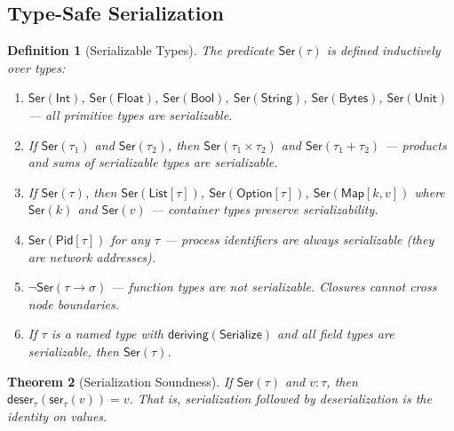 \documentclass[11pt,a4paper]{article}
\newtheorem{theorem}{Theorem}[section]
\newtheorem{definition}[theorem]{Definition}
\newcommand{\pid}{\textsf{Pid}}
\newcommand{\Ser}{\mathsf{Ser}}
\begin{document}
\subsection{Type-Safe Serialization}

\begin{definition}[Serializable Types]
The predicate $\Ser(\tau)$ is defined inductively over types:
\begin{enumerate}[nosep]
  \item $\Ser(\mathsf{Int})$, $\Ser(\mathsf{Float})$, $\Ser(\mathsf{Bool})$,
        $\Ser(\mathsf{String})$, $\Ser(\mathsf{Bytes})$, $\Ser(\mathsf{Unit})$
        --- all primitive types are serializable.
  \item If $\Ser(\tau_1)$ and $\Ser(\tau_2)$, then
        $\Ser(\tau_1 \times \tau_2)$ and $\Ser(\tau_1 + \tau_2)$
        --- products and sums of serializable types are serializable.
  \item If $\Ser(\tau)$, then $\Ser(\mathsf{List}[\tau])$,
        $\Ser(\mathsf{Option}[\tau])$, $\Ser(\mathsf{Map}[k,v])$
        where $\Ser(k)$ and $\Ser(v)$ --- container types preserve
        serializability.
  \item $\Ser(\pid[\tau])$ for any $\tau$ --- process identifiers are
        always serializable (they are network addresses).
  \item $\neg\Ser(\tau \to \sigma)$ --- function types are \emph{not}
        serializable. Closures cannot cross node boundaries.
  \item If $\tau$ is a named type with $\mathsf{deriving}(\mathsf{Serialize})$
        and all field types are serializable, then $\Ser(\tau)$.
\end{enumerate}
\end{definition}

\begin{theorem}[Serialization Soundness]
\label{thm:ser-sound}
If $\Ser(\tau)$ and $v : \tau$, then
$\mathsf{deser}_\tau(\mathsf{ser}_\tau(v)) = v$. That is, serialization
followed by deserialization is the identity on values.
\end{theorem}
\end{document}
